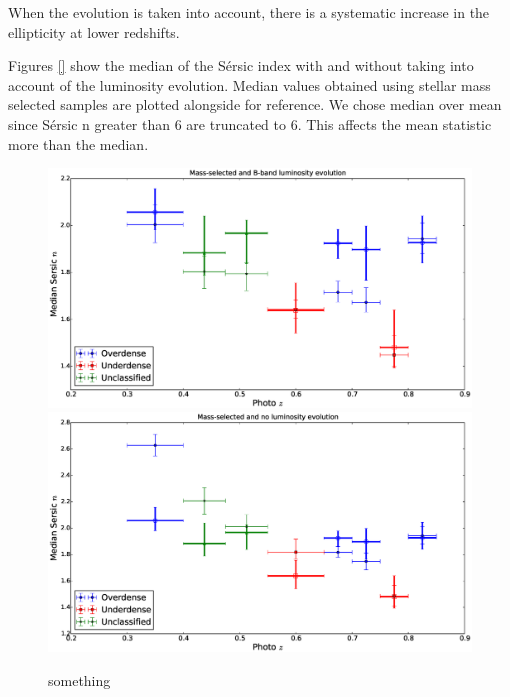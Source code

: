 \documentclass[twocolumn,useAMS,usenatbib]{mn2e}
\newcommand{\sersic}{S\'{e}rsic }
\begin{document}
When the evolution is taken into account, there is a systematic increase in the ellipticity at lower redshifts. 

Figures \ref{} show the median of the \sersic index with and without taking into account of the luminosity evolution. Median values obtained using stellar mass selected samples are plotted alongside for reference.
We chose median over mean since \sersic n greater than 6 are truncated to 6. This affects the mean statistic more than the median.
\begin{figure}
 \centering
 \includegraphics[width=\columnwidth]{median_sersicn}
 \includegraphics[width=\columnwidth]{median_sersicn(2)}
 \caption{something}
 \label{fig:median_sersicn}
\end{figure}
\end{document}
